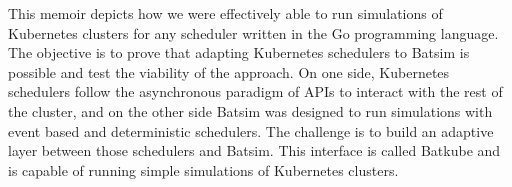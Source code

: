 This memoir depicts how we were effectively able to run simulations of
Kubernetes clusters for any scheduler written in the Go programming language.
The objective is to prove that adapting Kubernetes schedulers to Batsim is
possible and test the viability of the approach. On one side, Kubernetes
schedulers follow the asynchronous paradigm of APIs to interact with the rest
of the cluster, and on the other side Batsim was designed to run simulations
with event based and deterministic schedulers.  The challenge is to build an
adaptive layer between those schedulers and Batsim. This interface is called
Batkube and is capable of running simple simulations of Kubernetes clusters.
